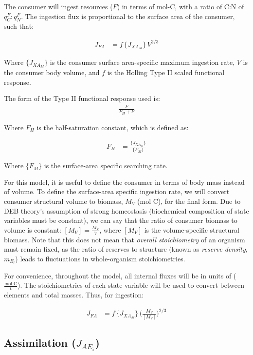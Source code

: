 \documentclass[
]{article}
\begin{document}
The consumer will ingest resources (\(F\)) in terms of mol-C, with a
ratio of C:N of \(q_{C}^{F}:q_{N}^{F}\). The ingestion flux is
proportional to the surface area of the consumer, such that:

\begin{align*}
J_{FA} &= f\,{\{J_{X{A_M}}\}}\,{V^{2/3}}
\end{align*}

Where \(\{J_{X{A_M}}\}\) is the consumer surface area-specific maximum
ingestion rate, \(V\) is the consumer body volume, and \(f\) is the
Holling Type II scaled functional response.

The form of the Type II functional response used is: \begin{align}
\frac{F}{{F_H}+F}
\end{align}

Where \({F_H}\) is the half-saturation constant, which is defined as:

\begin{align*}
F_H &= \frac{\{J_{X{A_M}}\}}{\{F_M\}}
\end{align*}

Where \(\{F_M\}\) is the surface-area specific searching rate.

For this model, it is useful to define the consumer in terms of body
mass instead of volume. To define the surface-area specific ingestion
rate, we will convert consumer structural volume to biomass, \(M_V\)
(mol C), for the final form. Due to DEB theory's assumption of strong
homeostasis (biochemical composition of state variables must be
constant), we can say that the ratio of consumer biomass to volume is
constant: \([M_V] = \frac{M_V}{V}\), where \([M_V]\) is the
volume-specific structural biomass. Note that this does not mean that
\emph{overall stoichiometry} of an organism must remain fixed, as the
ratio of reserves to structure (known as \emph{reserve density},
\(m_{E_i}\)) leads to fluctuations in whole-organism stoichiometries.

For convenience, throughout the model, all internal fluxes will be in
units of (\(\frac{\text{mol C}}{t}\)). The stoichiometries of each state
variable will be used to convert between elements and total masses.
Thus, for ingestion:

\begin{align}
J_{FA} &= f\,{\{J_{X{A_M}}}\}\,{\biggl(\frac{M_V}{[M_V]}\biggr)^{2/3}}
\end{align}

\subsection{\texorpdfstring{Assimilation
(\(J_{A{E_i}}\))}{Assimilation (J\_\{A\{E\_i\}\})}}\label{assimilation-j_ae_i}
\end{document}
